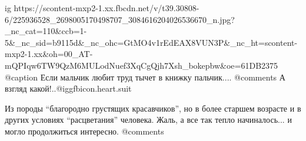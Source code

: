  
 
 
 
 

\ifcmt
  ig https://scontent-mxp2-1.xx.fbcdn.net/v/t39.30808-6/225936528_2698005170498707_3084616204026536670_n.jpg?_nc_cat=110&ccb=1-5&_nc_sid=b9115d&_nc_ohc=GtMO4v1rEdEAX8VUN3P&_nc_ht=scontent-mxp2-1.xx&oh=00_AT-mQPIqw6TW9QzM6MULodNuef3XqCgQjh7Xsh_bokepbw&oe=61DB2375
  @caption Если мальчик любит труд тычет в книжку пальчик....
	@comments%
А взгляд какой!..@igg{fbicon.heart.suit}


Из породы \enquote{благородно грустящих красавчиков}, но в более старшем возрасте и в
других условиях \enquote{расцветания} человека. Жаль, а все так тепло начиналось... и
могло продолжиться интересно. 
	@comments%
\fi
